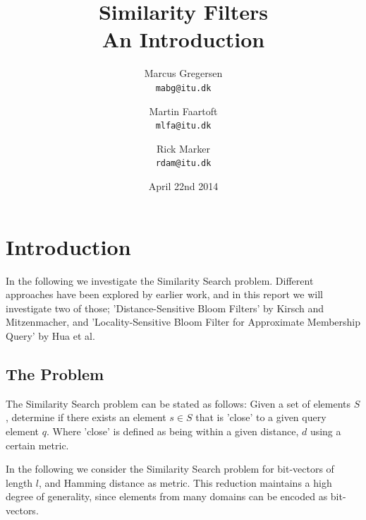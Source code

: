 \documentclass[a4paper,11pt]{article}
\begin{document}
\graphicspath{ {./images/} }
\date{April 22nd 2014}
\title{Similarity Filters\\An Introduction}

\author{Marcus Gregersen\\
\texttt{mabg@itu.dk}
\and Martin Faartoft\\
\texttt{mlfa@itu.dk}
\and Rick Marker\\
\texttt{rdam@itu.dk}}
\clearpage\maketitle
\thispagestyle{empty}
\setcounter{page}{1}

\section{Introduction}
In the following we investigate the Similarity Search problem. Different approaches have been explored by earlier work, and in this report we will investigate two of those; 'Distance-Sensitive Bloom Filters'\cite{paper:harvard} by Kirsch and Mitzenmacher, and 'Locality-Sensitive Bloom Filter for Approximate Membership Query'\cite{paper:hua} by Hua et al.

\subsection{The Problem}
The Similarity Search problem can be stated as follows: Given a set of elements $S$, determine if there exists an element $s \in S$ that is 'close' to a given query element $q$. Where 'close' is defined as being within a given distance, $d$ using a certain metric.

In the following we consider the Similarity Search problem for bit-vectors of length $l$, and Hamming distance as metric. This reduction maintains a high degree of generality, since elements from many domains can be encoded as bit-vectors.
\end{document}
